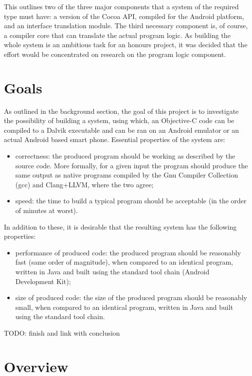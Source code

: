 \documentclass[parskip]{cs4rep}
\begin{document}
This outlines two of the three major components that a system of the required type must have: a version of the Cocoa API, compiled for the Android platform, and an interface translation module. The third necessary component is, of course, a compiler core that can translate the actual program logic. As building the whole system is an ambitious task for an honours project, it was decided that the effort would be concentrated on research on the program logic component.

\section{Goals} \label{sec:goals}

As outlined in the background section, the goal of this project is to investigate the possibility of building a system, using which, an Objective-C code can be compiled to a Dalvik executable and can be ran on an Android emulator or an actual Android based smart phone. Essential properties of the system are:
\begin{itemize}
\item
correctness: the produced program should be working as described by the source code. More formally, for a given input the program should produce the same output as native programs compiled by the Gnu Compiler Collection (gcc) and Clang+LLVM, where the two agree;
\item
speed: the time to build a typical program should be acceptable (in the order of minutes at worst).
\end{itemize}

In addition to these, it is desirable that the resulting system has the following properties:

\begin{itemize}
\item
performance of produced code: the produced program should be reasonably fast (same order of magnitude), when compared to an identical program, written in Java and built using the standard tool chain (Android Development Kit);
\item
size of produced code: the size of the produced program should be reasonably small, when compared to an identical program, written in Java and built using the standard tool chain.
\end{itemize}

TODO: finish and link with conclusion

\section{Overview}
\end{document}
